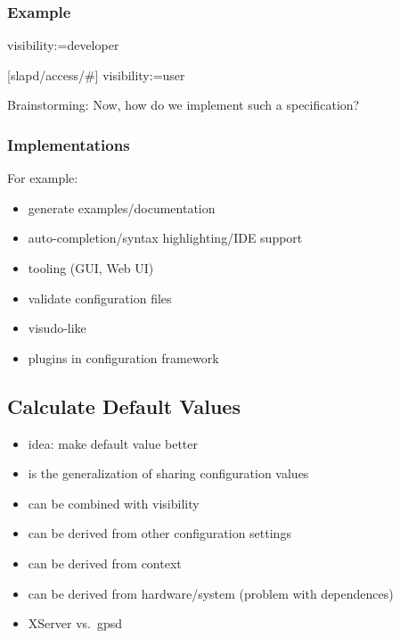 \begin{frame}[fragile]
	\frametitle{Example}
	\begin{code}
	visibility:=developer

	[slapd/access/#]
	visibility:=user
	\end{code}
\end{frame}


\begin{assignment}
	\begin{task}
	Brainstorming: Now, how do we implement such a specification?
	\end{task}
\end{assignment}

\begin{frame}
	\frametitle{Implementations}
	For example:
	\begin{itemize}
	\item generate examples/documentation
	\item auto-completion/syntax highlighting/IDE support
	\item tooling (GUI, Web UI)
	\item validate configuration files
	\item visudo-like
	\item plugins in configuration framework
	\end{itemize}
\end{frame}

\subsection{Calculate Default Values}

\begin{frame}
	\begin{itemize}
	\item idea: make default value better
	\item is the generalization of sharing configuration values
	\item can be combined with visibility
	\pause
	\item can be derived from other configuration settings
	\item can be derived from context~\cite{raab2017introducing}
	\item can be derived from hardware/system (problem with dependences)
	\pause
	\item XServer vs.\ gpsd
	\end{itemize}
\end{frame}

